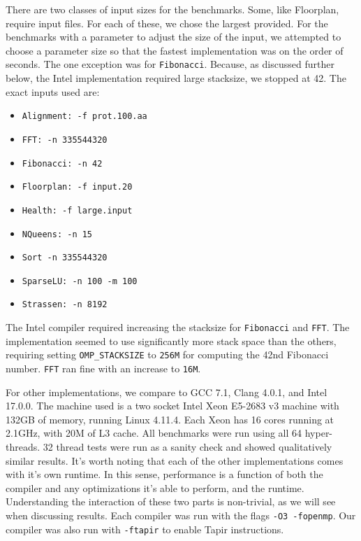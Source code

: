 \documentclass[sigconf]{acmart}
\begin{document}
There are two classes of input sizes for the benchmarks. Some, like Floorplan,
require input files. For each of these, we chose the largest provided. For the
benchmarks with a parameter to adjust the size of the input, we attempted to 
choose a parameter size so that the fastest implementation was on the order of
seconds. The one exception was for \texttt{Fibonacci}. Because, as discussed
further below, the Intel implementation required large stacksize, we stopped at
42. The exact inputs used are:

\begin{itemize}
\item \texttt{Alignment: -f prot.100.aa} 
\item \texttt{FFT: -n 335544320}
\item \texttt{Fibonacci: -n 42}
\item \texttt{Floorplan: -f input.20}
\item \texttt{Health: -f large.input}
\item \texttt{NQueens: -n 15}
\item \texttt{Sort -n 335544320}
\item \texttt{SparseLU: -n 100 -m 100}
\item \texttt{Strassen: -n 8192}
\end{itemize}

The Intel compiler required increasing the stacksize for \texttt{Fibonacci} and
\texttt{FFT}. The implementation seemed to use significantly more stack space
than the others, requiring setting \texttt{OMP\_STACKSIZE} to \texttt{256M} for
computing the 42nd Fibonacci number. \texttt{FFT} ran fine with an increase to
\texttt{16M}.  

For other implementations, we compare to GCC 7.1, Clang 4.0.1, and Intel
17.0.0. The machine used is a two socket Intel Xeon E5-2683 v3 machine with
132GB of memory, running Linux 4.11.4. Each Xeon has 16 cores running at
2.1GHz, with 20M of L3 cache. All benchmarks were run using all 64
hyper-threads. 32 thread tests were run as a sanity check and showed
qualitatively similar results. It's worth noting that each of the other
implementations comes with it's own runtime. In this sense, performance is a
function of both the compiler and any optimizations it's able to perform, and
the runtime.  Understanding the interaction of these two parts is non-trivial,
as we will see when discussing results. Each compiler was run with the flags
\texttt{-O3 -fopenmp}. Our compiler was also run with \texttt{-ftapir} to
enable Tapir instructions.
\end{document}
